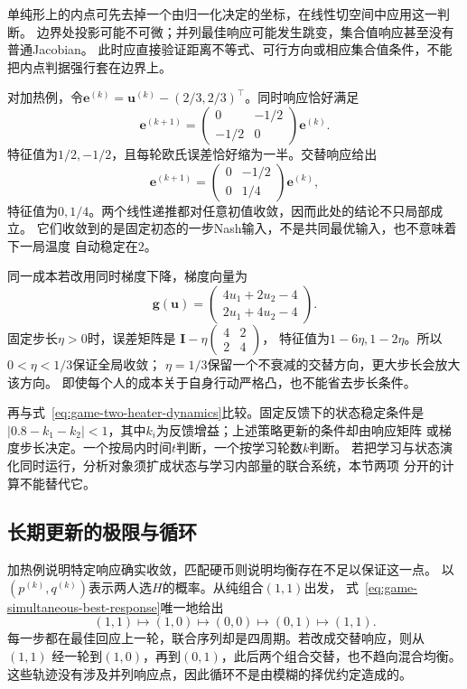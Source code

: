 单纯形上的内点可先去掉一个由归一化决定的坐标，在线性切空间中应用这一判断。
边界处投影可能不可微；并列最佳响应可能发生跳变，集合值响应甚至没有普通Jacobian。
此时应直接验证距离不等式、可行方向或相应集合值条件，不能把内点判据强行套在边界上。

对加热例，令\(\bm e^{(k)}=\bm u^{(k)}-(2/3,2/3)^\top\)。同时响应恰好满足
\begin{equation}
  \bm e^{(k+1)}
  =
  \begin{pmatrix}0&-1/2\\-1/2&0\end{pmatrix}\bm e^{(k)}.
  \label{eq:game-heater-response-error}
\end{equation}
特征值为\(1/2,-1/2\)，且每轮欧氏误差恰好缩为一半。交替响应给出
\[
  \bm e^{(k+1)}
  =
  \begin{pmatrix}0&-1/2\\0&1/4\end{pmatrix}\bm e^{(k)},
\]
特征值为\(0,1/4\)。两个线性递推都对任意初值收敛，因而此处的结论不只局部成立。
它们收敛到的是固定初态的一步Nash输入，不是共同最优输入，也不意味着下一局温度
自动稳定在\(2\)。

同一成本若改用同时梯度下降，梯度向量为
\[
  \bm g(\bm u)=
  \begin{pmatrix}4u_1+2u_2-4\\2u_1+4u_2-4\end{pmatrix}.
\]
固定步长\(\eta>0\)时，误差矩阵是
\(\bm I-\eta\left(\begin{smallmatrix}4&2\\2&4\end{smallmatrix}\right)\)，
特征值为\(1-6\eta,1-2\eta\)。所以\(0<\eta<1/3\)保证全局收敛；
\(\eta=1/3\)保留一个不衰减的交替方向，更大步长会放大该方向。
即使每个人的成本关于自身行动严格凸，也不能省去步长条件。

再与式~\eqref{eq:game-two-heater-dynamics}比较。固定反馈下的状态稳定条件是
\(|0.8-k_1-k_2|<1\)，其中\(k_i\)为反馈增益；上述策略更新的条件却由响应矩阵
或梯度步长决定。一个按局内时间\(t\)判断，一个按学习轮数\(k\)判断。
若把学习与状态演化同时运行，分析对象须扩成状态与学习内部量的联合系统，本节两项
分开的计算不能替代它。

\subsection{长期更新的极限与循环}
\label{sec:game-limits-cycles}

加热例说明特定响应确实收敛，匹配硬币则说明均衡存在不足以保证这一点。
以\((p^{(k)},q^{(k)})\)表示两人选\(H\)的概率。从纯组合\((1,1)\)出发，
式~\eqref{eq:game-simultaneous-best-response}唯一地给出
\[
  (1,1)\longmapsto(1,0)\longmapsto(0,0)
  \longmapsto(0,1)\longmapsto(1,1).
\]
每一步都在最佳回应上一轮，联合序列却是四周期。若改成交替响应，则从\((1,1)\)
经一轮到\((1,0)\)，再到\((0,1)\)，此后两个组合交替，也不趋向混合均衡。
这些轨迹没有涉及并列响应点，因此循环不是由模糊的择优约定造成的。

